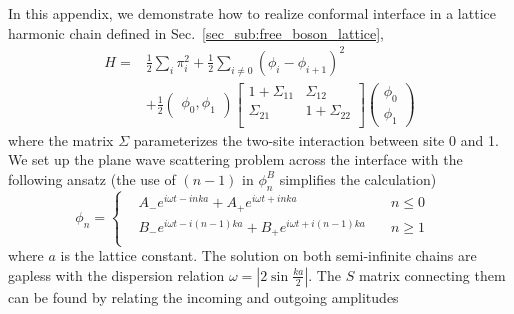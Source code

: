 
In this appendix, we demonstrate how to realize conformal interface in a lattice harmonic chain defined in Sec.~\ref{sec_sub:free_boson_lattice},
\begin{equation}
\begin{aligned}
H =& \frac{1}{2} \sum_i \pi_i^2  +  \frac{1}{2} \sum_{i\ne 0 }  ( \phi_i - \phi_{i+1} )^2  \\
 &+ \frac{1}{2} \begin{pmatrix}  \phi_0, \phi_1 \end{pmatrix}
\begin{bmatrix}
1 + \Sigma_{11}  & \Sigma_{12} \\
\Sigma_{21} &  1 + \Sigma_{22} \\
\end{bmatrix}
\begin{pmatrix}
  \phi_0 \\
  \phi_1 
\end{pmatrix}
\end{aligned}
\end{equation}
where the matrix $\Sigma$ parameterizes the two-site interaction between site 0 and 1. We set up the plane wave scattering problem across the interface with the following ansatz (the use of $(n-1)$ in $\phi_n^B$ simplifies the calculation)
\begin{equation}
\label{eq:ansatz}
\phi_n
= \left\lbrace
  \begin{aligned}
	& A_{-} e^{i \omega t  - inka}  + A_{+} e^{i \omega t  + inka}  & \quad  n \le 0 \\
	& B_{-} e^{i \omega t  - i(n-1)ka}  + B_{+} e^{i \omega t  + i(n-1)ka} & \quad n \ge 1 \\
  \end{aligned} \right. 
 \quad 
\end{equation}
where $a$ is the lattice constant. The solution on both semi-infinite chains are gapless with the dispersion relation $\omega = \left|2\sin\frac{ka}{2}\right|$. The $S$ matrix connecting them can be found by relating the incoming and outgoing amplitudes
